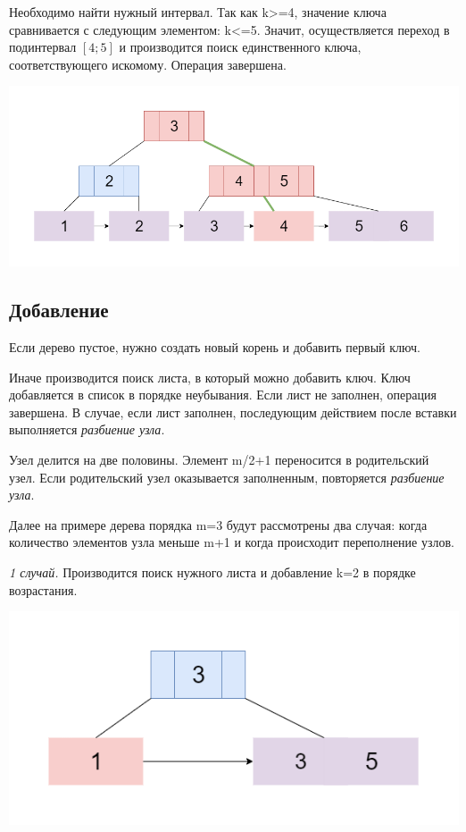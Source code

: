 \documentclass{article}
\begin{document}
Необходимо найти нужный интервал. Так как k>=4, значение ключа сравнивается с следующим элементом: k<=5. Значит, осуществляется переход в подинтервал $[4; 5]$ и производится поиск единственного ключа, соответствующего искомому. Операция завершена.

\includegraphics[scale=0.4]{bsearch3.png}

\subsection{Добавление}
Если дерево пустое, нужно создать новый корень и добавить первый ключ.

 Иначе производится поиск листа, в который можно добавить ключ. Ключ добавляется в список в порядке неубывания. Если лист не заполнен, операция завершена. В случае, если лист заполнен, последующим действием после вставки выполняется \textit{разбиение узла}.

Узел делится на две половины. Элемент m/2+1 переносится в родительский узел. Если родительский узел оказывается заполненным, повторяется \textit{разбиение узла}.

Далее на примере дерева порядка m=3 будут рассмотрены два случая: когда количество элементов узла меньше m+1 и когда происходит переполнение узлов.


\textit{1 случай.} Производится поиск нужного листа и добавление k=2 в порядке возрастания.

\includegraphics[scale=0.4]{binsert11.png}
\end{document}
